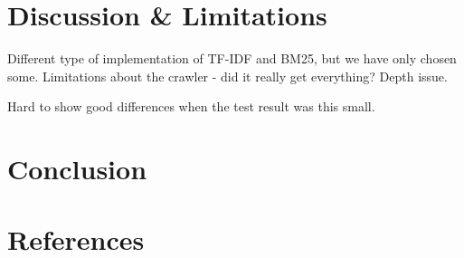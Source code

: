 

\section{Discussion \& Limitations} %
\label{sec:discussion_&_limitations}

Different type of implementation of TF-IDF and BM25, but we have only chosen some. 
Limitations about the crawler - did it really get everything? Depth issue.

Hard to show good differences when the test result was this small.


\section{Conclusion} %
\label{sec:conclusion}


\section{References} %
\label{sec:references}




